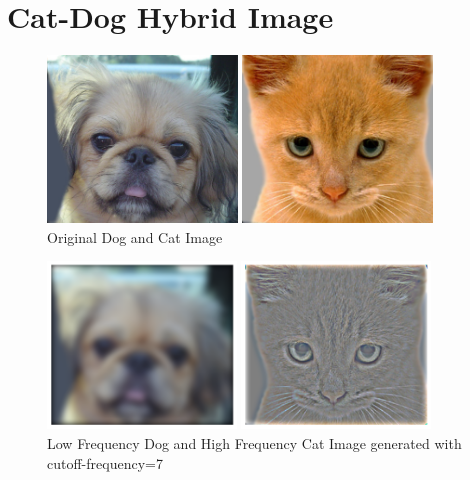 \documentclass[12pt]{report}
\begin{document}
\section{Cat-Dog Hybrid Image}
\vspace{1.25em}
\begin{figure}[H]
	\centering
	\begin{minipage}{0.45\textwidth}
			\centering
			\includegraphics[height=12em]{./images/dog.jpg}
		\end{minipage}
		\begin{minipage}{0.45\textwidth}
			\centering
			\includegraphics[height=12em]{./images/cat.jpg}
		\end{minipage}
		\caption{Original Dog and Cat Image}
		\label{dog_cat}
\end{figure}
\begin{figure}[H]
	\centering
	\begin{minipage}{0.45\textwidth}
			\centering
			\includegraphics[height=12em]{./images/dog_low.png}
		\end{minipage}
		\begin{minipage}{0.45\textwidth}
			\centering
			\includegraphics[height=12em]{./images/cat_high.png}
		\end{minipage}
		\caption{Low Frequency Dog and High Frequency Cat Image generated with cutoff-frequency=7}
		\label{dog_cat_low_high}
\end{figure}
\end{document}

